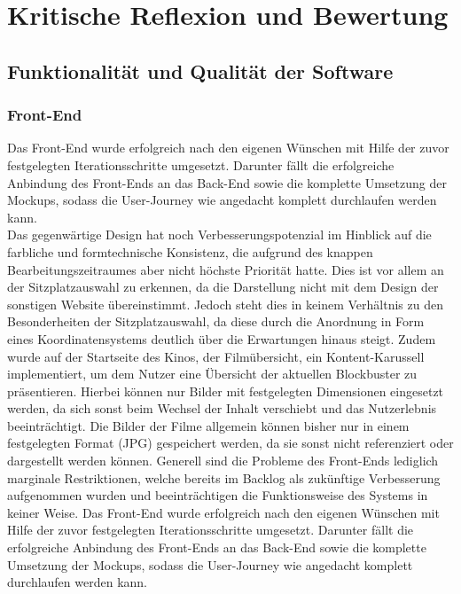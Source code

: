 \section{Kritische Reflexion und Bewertung}
\multipleauthorsection{\authorRF}{\authorEJ}

\subsection{Funktionalität und Qualität der Software}

\subsubsection*{Front-End}
Das Front-End wurde erfolgreich nach den eigenen Wünschen mit Hilfe der zuvor festgelegten Iterationsschritte umgesetzt.
Darunter fällt die erfolgreiche Anbindung des Front-Ends an das Back-End sowie die komplette Umsetzung der Mockups, sodass die User-Journey wie angedacht komplett durchlaufen werden kann.\\
Das gegenwärtige Design hat noch Verbesserungspotenzial im Hinblick auf die farbliche und formtechnische Konsistenz, die aufgrund des knappen Bearbeitungszeitraumes aber nicht höchste Priorität hatte.
Dies ist vor allem an der Sitzplatzauswahl zu erkennen, da die Darstellung nicht mit dem Design der sonstigen Website übereinstimmt.
Jedoch steht dies in keinem Verhältnis zu den Besonderheiten der Sitzplatzauswahl, da diese durch die Anordnung in Form eines Koordinatensystems deutlich über die Erwartungen hinaus steigt.
Zudem wurde auf der Startseite des Kinos, der Filmübersicht, ein Kontent-Karussell implementiert, um dem Nutzer eine Übersicht der aktuellen Blockbuster zu präsentieren.
Hierbei können nur Bilder mit festgelegten Dimensionen eingesetzt werden, da sich sonst beim Wechsel der Inhalt verschiebt und das Nutzerlebnis beeinträchtigt.
Die Bilder der Filme allgemein können bisher nur in einem festgelegten Format (JPG) gespeichert werden, da sie sonst nicht referenziert oder dargestellt werden können.
Generell sind die Probleme des Front-Ends lediglich marginale Restriktionen, welche bereits im Backlog als zukünftige Verbesserung aufgenommen wurden und beeinträchtigen die Funktionsweise des Systems in keiner Weise.
Das Front-End wurde erfolgreich nach den eigenen Wünschen mit Hilfe der zuvor festgelegten Iterationsschritte umgesetzt.
Darunter fällt die erfolgreiche Anbindung des Front-Ends an das Back-End sowie die komplette Umsetzung der Mockups, sodass die User-Journey wie angedacht komplett durchlaufen werden kann.
